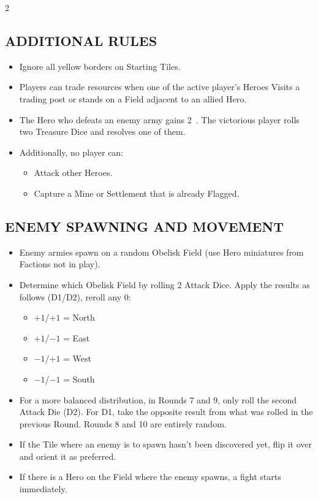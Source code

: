 \begin{multicols}{2}
\subsection*{\MakeUppercase{Additional Rules}}

\begin{itemize}
  \item Ignore all yellow borders on Starting Tiles.
  \item Players can trade resources when one of the active player's Heroes Visits a trading post or stands on a Field adjacent to an allied Hero.
  \item The Hero who defeats an enemy army gains 2~.
    The victorious player rolls two Treasure Dice and resolves one of them.
  \item Additionally, no player can:
  \begin{itemize}
      \item Attack other Heroes.
      \item Capture a Mine or Settlement that is already Flagged.
  \end{itemize}
\end{itemize}

\subsection*{\MakeUppercase{Enemy Spawning and Movement}}

\begin{itemize}
  \item Enemy armies spawn on a random Obelisk Field (use Hero miniatures from Factions not in play).
  \item Determine which Obelisk Field by rolling 2 Attack Dice. Apply the results as follows (D1/D2), reroll any 0:
  \begin{itemize}
    \item $+1$/$+1$ = North
    \item $+1$/$-1$ = East
    \item $-1$/$+1$ = West
    \item $-1$/$-1$ = South
  \end{itemize}

  \item For a more balanced distribution, in Rounds 7 and 9, only roll the second Attack Die (D2). For D1, take the opposite result from what was rolled in the previous Round.
  Rounds 8 and 10 are entirely random.
  \item If the Tile where an enemy is to spawn hasn't been discovered yet, flip it over and orient it as preferred.
  \item If there is a Hero on the Field where the enemy spawns, a fight starts immediately.


\end{itemize}
\end{multicols}
